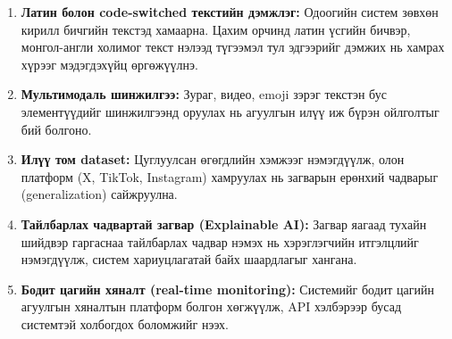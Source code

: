 \begin{enumerate}
  \item \textbf{Латин болон code-switched текстийн дэмжлэг:} Одоогийн систем
        зөвхөн кирилл бичгийн текстэд хамаарна. Цахим орчинд латин үсгийн
        бичвэр, монгол-англи холимог текст нэлээд түгээмэл тул эдгээрийг дэмжих
        нь хамрах хүрээг мэдэгдэхүйц өргөжүүлнэ.

  \item \textbf{Мультимодаль шинжилгээ:} Зураг, видео, emoji зэрэг текстэн бус
        элементүүдийг шинжилгээнд оруулах нь агуулгын илүү иж бүрэн ойлголтыг
        бий болгоно.

  \item \textbf{Илүү том dataset:} Цуглуулсан өгөгдлийн хэмжээг нэмэгдүүлж,
        олон платформ (X, TikTok, Instagram) хамруулах нь загварын ерөнхий
        чадварыг (generalization) сайжруулна.

  \item \textbf{Тайлбарлах чадвартай загвар (Explainable AI):} Загвар яагаад
        тухайн шийдвэр гаргаснаа тайлбарлах чадвар нэмэх нь хэрэглэгчийн
        итгэлцлийг нэмэгдүүлж, систем хариуцлагатай байх шаардлагыг хангана.

  \item \textbf{Бодит цагийн хяналт (real-time monitoring):} Системийг бодит
        цагийн агуулгын хяналтын платформ болгон хөгжүүлж, API хэлбэрээр бусад
        системтэй холбогдох боломжийг нээх.
\end{enumerate}

